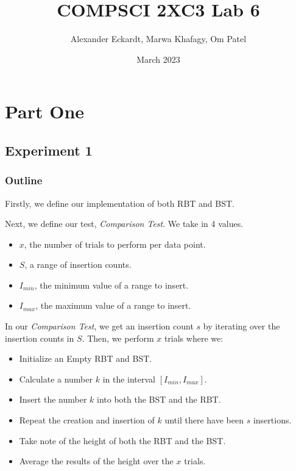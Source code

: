 \documentclass{article}
\title{COMPSCI 2XC3 Lab 6}
\author{Alexander Eckardt, Marwa Khafagy, Om Patel}
\date{March 2023}
\begin{document}
\maketitle
\newpage

\tableofcontents
\newpage

\listoffigures
\newpage



\section{Part One}

\subsection{Experiment 1}
\subsubsection{Outline}

Firstly, we define our implementation of both RBT and BST.

Next, we define our test, \textit{Comparison Test}. We take in 4 values.
\begin{itemize}
    \item $x$, the number of trials to perform per data point.
    \item $S$, a range of insertion counts.
    \item $I_{min}$, the minimum value of a range to insert.
    \item $I_{max}$, the maximum value of a range to insert.
\end{itemize}

In our \textit{Comparison Test}, we get an insertion count $s$ by iterating over the insertion counts in $S$.
Then, we perform $x$ trials where we:

\begin{itemize}
    \item Initialize an Empty RBT and BST.
    \item Calculate a number $k$ in the interval $[I_{min}, I_{max}]$.
    \item Insert the number $k$ into both the BST and the RBT.
    \item Repeat the creation and insertion of $k$ until there have been $s$ insertions.
    \item Take note of the height of both the RBT and the BST.
    \item Average the results of the height over the $x$ trials.
\end{itemize}
\end{document}
